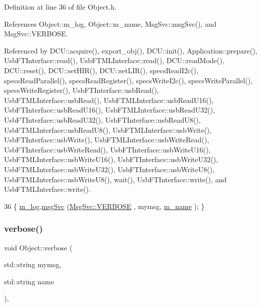 Definition at line 36 of file Object.\+h.



References Object\+::m\+\_\+log, Object\+::m\+\_\+name, Msg\+Svc\+::msg\+Svc(), and Msg\+Svc\+::\+V\+E\+R\+B\+O\+SE.



Referenced by D\+C\+U\+::acquire(), export\+\_\+obj(), D\+C\+U\+::init(), Application\+::prepare(), Usb\+F\+T\+Interface\+::read(), Usb\+F\+T\+M\+L\+Interface\+::read(), D\+C\+U\+::read\+Mode(), D\+C\+U\+::reset(), D\+C\+U\+::set\+H\+I\+R(), D\+C\+U\+::set\+L\+I\+R(), specs\+Read\+I2c(), specs\+Read\+Parallel(), specs\+Read\+Register(), specs\+Write\+I2c(), specs\+Write\+Parallel(), specs\+Write\+Register(), Usb\+F\+T\+Interface\+::usb\+Read(), Usb\+F\+T\+M\+L\+Interface\+::usb\+Read(), Usb\+F\+T\+M\+L\+Interface\+::usb\+Read\+U16(), Usb\+F\+T\+Interface\+::usb\+Read\+U16(), Usb\+F\+T\+M\+L\+Interface\+::usb\+Read\+U32(), Usb\+F\+T\+Interface\+::usb\+Read\+U32(), Usb\+F\+T\+Interface\+::usb\+Read\+U8(), Usb\+F\+T\+M\+L\+Interface\+::usb\+Read\+U8(), Usb\+F\+T\+M\+L\+Interface\+::usb\+Write(), Usb\+F\+T\+Interface\+::usb\+Write(), Usb\+F\+T\+M\+L\+Interface\+::usb\+Write\+Read(), Usb\+F\+T\+Interface\+::usb\+Write\+Read(), Usb\+F\+T\+Interface\+::usb\+Write\+U16(), Usb\+F\+T\+M\+L\+Interface\+::usb\+Write\+U16(), Usb\+F\+T\+Interface\+::usb\+Write\+U32(), Usb\+F\+T\+M\+L\+Interface\+::usb\+Write\+U32(), Usb\+F\+T\+Interface\+::usb\+Write\+U8(), Usb\+F\+T\+M\+L\+Interface\+::usb\+Write\+U8(), wait(), Usb\+F\+T\+Interface\+::write(), and Usb\+F\+T\+M\+L\+Interface\+::write().


\begin{DoxyCode}
36 \{ \hyperlink{classObject_a0d269813dd7ac1f24bc143031e2963f2}{m\_log}.\hyperlink{classMsgSvc_ad25f18047920cc59a314e5098259711c}{msgSvc} (\hyperlink{classMsgSvc_ae671eb7301996cd049d2da8a65925926af655256b06494ade5ba830abe5401ec9}{MsgSvc::VERBOSE} , mymsg, \hyperlink{classObject_a8b83c95c705d2c3ba0d081fe1710f48d}{m\_name} ); \}
\end{DoxyCode}
\mbox{\label{classObject_a2d4120195317e2a3c6532e8bb9f3da68}} 
\subsubsection{\texorpdfstring{verbose()}{verbose()}\hspace{0.1cm}{\footnotesize\ttfamily [2/2]}}
{\footnotesize\ttfamily void Object\+::verbose (\begin{DoxyParamCaption}\item[{std\+::string}]{mymsg,  }\item[{std\+::string}]{name }\end{DoxyParamCaption})\hspace{0.3cm}{\ttfamily [inline]}, {\ttfamily [inherited]}}



